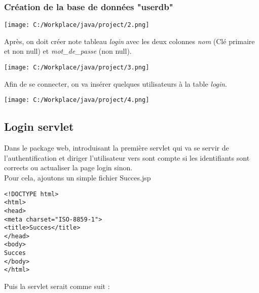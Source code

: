 \documentclass[12]{article}
\begin{document}
\subsubsection{Création de la base de données "userdb"}


\begin{center}
\texttt{[image: C:/Workplace/java/project/2.png]}
\end{center}

Après, on doit créer note tableau \textit{login} avec les deux colonnes \textit{nom} (Clé primaire et non null) et \textit{mot\_de\_passe} (non null).\\

\begin{center}
\texttt{[image: C:/Workplace/java/project/3.png]}
\end{center}

Afin de se connecter, on va insérer quelques utilisateurs à la table \textit{login}.\\


\begin{center}
\texttt{[image: C:/Workplace/java/project/4.png]}
\end{center}






\subsection{Login servlet}

Dans le package web, introduisant la première servlet qui va se servir de l'authentification et diriger l'utilisateur vers sont compte si les identifiants sont corrects ou actualiser la page login sinon.\\

Pour cela, ajoutons un simple fichier Succes.jsp \\

\lstset{language=XML}
\begin{lstlisting}
<!DOCTYPE html>
<html>
<head>
<meta charset="ISO-8859-1">
<title>Succes</title>
</head>
<body>
Succes
</body>
</html>
\end{lstlisting}


\newpage

Puis la servlet serait comme suit :\\
\end{document}
